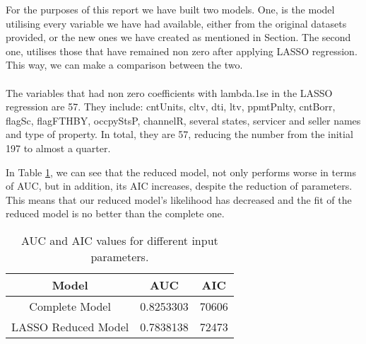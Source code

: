 For the purposes of this report we have built two models. One, is the model 
utilising every variable we have had available, either from the original 
datasets provided, or the new ones we have created as mentioned in Section. 
The second one, utilises those that have remained non zero after applying 
LASSO regression. This way, we can make a comparison between the two.
\\\\
The variables that had non zero coefficients with lambda.1se in the LASSO 
regression are 57. They include: cntUnits, cltv, dti, ltv, ppmtPnlty, 
cntBorr, flagSc, flagFTHBY, occpyStsP, channelR, several states, servicer 
and seller names and type of property. In total, they are 57, reducing the 
number from the initial 197 to almost a quarter. 


    
In Table \ref{ModelAICandAUC}, we can see that the reduced model, not only 
performs worse in terms of AUC, but in addition, its AIC increases, 
despite the reduction of parameters. This means that our reduced model's 
likelihood has decreased and the fit of the reduced model is no better 
than the complete one.
    
\begin{table}[H]
    \centering
        \begin{tabular}{c|c|c}
        Model & AUC & AIC \\\hline
        Complete Model & 0.8253303 & 70606\\
        LASSO Reduced Model &  0.7838138 & 72473\\
        
	    \end{tabular}
        \caption{AUC and AIC values for different input parameters.}
        \label{ModelAICandAUC}
\end{table}

